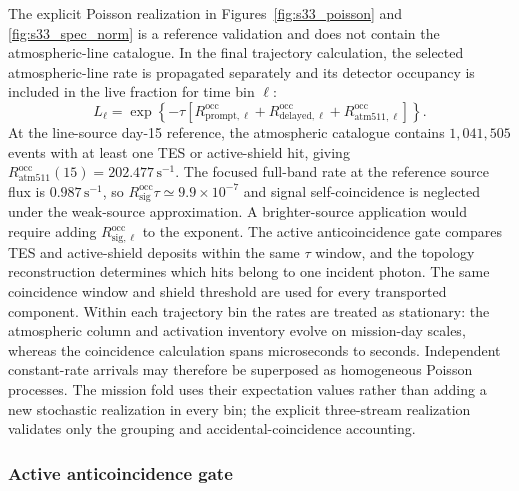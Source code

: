 \documentclass[11pt]{article}
\begin{document}
The explicit Poisson realization in Figures~\ref{fig:s33_poisson} and
\ref{fig:s33_spec_norm} is a reference validation and does not contain the
atmospheric-line catalogue. In the final trajectory calculation, the selected
atmospheric-line rate is propagated separately and its detector occupancy is
included in the live fraction for time bin $\ell$:
\begin{equation}
  L_{\ell}=\exp\!\left\{-\tau\left[
  R^{\mathrm{occ}}_{\mathrm{prompt},\ell}+
  R^{\mathrm{occ}}_{\mathrm{delayed},\ell}+
  R^{\mathrm{occ}}_{\mathrm{atm511},\ell}\right]\right\}.
  \label{eq:atm511_live_factor}
\end{equation}
At the line-source day-15 reference, the atmospheric catalogue contains
$1{,}041{,}505$ events with at least one TES or active-shield hit, giving
$R^{\mathrm{occ}}_{\mathrm{atm511}}(15)=202.477\,\mathrm{s^{-1}}$. The focused
full-band rate at the reference source flux is $0.987\,\mathrm{s^{-1}}$, so
$R^{\mathrm{occ}}_{\mathrm{sig}}\tau\simeq9.9\times10^{-7}$ and signal
self-coincidence is neglected under the weak-source approximation. A brighter-source
application would require adding $R^{\mathrm{occ}}_{\mathrm{sig},\ell}$ to the
exponent.
The active anticoincidence gate compares TES and active-shield deposits within
the same $\tau$ window, and the topology reconstruction determines which hits
belong to one incident photon. The same coincidence window and shield threshold
are used for every transported component. Within each trajectory bin the rates
are treated as stationary: the atmospheric column and activation inventory evolve
on mission-day scales, whereas the coincidence calculation spans microseconds to
seconds. Independent constant-rate arrivals may therefore be superposed as
homogeneous Poisson processes. The mission fold uses their expectation values
rather than adding a new stochastic realization in every bin; the explicit
three-stream realization validates only the grouping and accidental-coincidence
accounting.

\subsubsection{Active anticoincidence gate}
\end{document}
